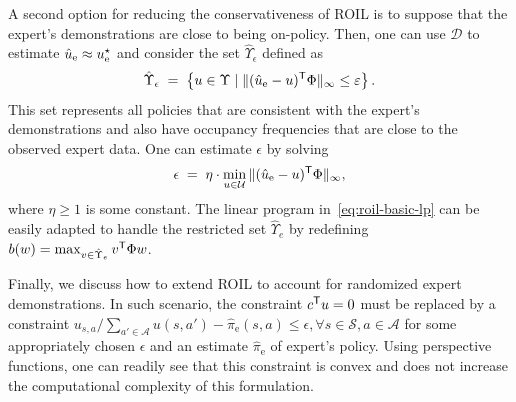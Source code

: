 A second option for reducing the conservativeness of ROIL is to suppose that the expert's demonstrations are close to being on-policy.
Then, one can use $\mathcal{D}$ to estimate $\hat{u}_{\mathrm{e}} \approx u_{\mathrm{e}}^{\star} $ and consider the set $\hat{\Upsilon}_{\epsilon}$ defined as
%
\begin{equation}
\label{linf_constraint}
\hat{\Upsilon}_{\epsilon}
\;=\;
\left\{ u \in \Upsilon \mid \| (\hat{u}_{\mathrm{e}} - u)^{\mathsf{T}} \Phi \|_{\infty} \le \varepsilon \right\}.
\end{equation}
This set represents all policies that are consistent with the expert's demonstrations and also have occupancy frequencies that are close to the observed expert data. One can estimate $\epsilon$ by solving
\begin{equation}\label{eq:minimal-epsilon}
\epsilon \; =\;  \eta \cdot \min_{u\in \mathcal{U}}
\| (\hat{u}_{\mathrm{e}} - u)^{\mathsf{T}} \Phi \|_{\infty}, 
\end{equation}
where $\eta \ge 1$ is some constant. %
The linear program in~\eqref{eq:roil-basic-lp} can be easily adapted to handle the restricted set $\hat{\Upsilon}_e$ by redefining $b(w) = \max_{v \in \hat{\Upsilon}_e} v^{\mathsf{T}} \Phi  w$. 

Finally, we discuss how to extend ROIL to account for randomized expert demonstrations. In such scenario, the constraint $c^{\mathsf{T}} u = 0$ must be replaced by a constraint $u_{s,a} / \sum_{a'\in \mathcal{A}} u(s,a') - \hat{\pi}_{\mathrm{e}}( s,a ) \le \epsilon, \forall s\in \mathcal{S}, a\in \mathcal{A}$ for some appropriately chosen $\epsilon$ and an estimate $\hat{\pi}_{\mathrm{e}}$ of expert's policy. Using perspective functions, one can readily see that this constraint is convex and does not increase the computational complexity of this formulation.


